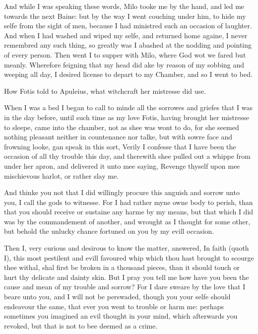 And while I was speaking these words, Milo tooke me by the hand, and led me
towards the next Baine: but by the way I went couching under him, to hide my
selfe from the sight of men, because I had ministred such an occasion of
laughter. And when I had washed and wiped my selfe, and returned home againe, I
never remembred any such thing, so greatly was I abashed at the nodding and
pointing of every person. Then went I to supper with Milo, where God wot we
fared but meanly. Wherefore feigning that my head did ake by reason of my
sobbing and weeping all day, I desired license to depart to my Chamber, and so
I went to bed.


How Fotis told to Apuleius, what witchcraft her mistresse did use.

When I was a bed I began to call to minde all the sorrowes and griefes that I
was in the day before, until such time as my love Fotis, having brought her
mistresse to sleepe, came into the chamber, not as shee was wont to do, for she
seemed nothing pleasant neither in countenance nor talke, but with sowre face
and frowning looke, gan speak in this sort, Verily I confesse that I have been
the occasion of all thy trouble this day, and therewith shee pulled out a
whippe from under her apron, and delivered it unto mee saying, Revenge thyself
upon mee mischievous harlot, or rather slay me.

And thinke you not that I did willingly procure this anguish and sorrow unto
you, I call the gods to witnesse. For I had rather myne owne body to perish,
than that you should receive or sustaine any harme by my means, but that which
I did was by the commandement of another, and wrought as I thought for some
other, but behold the unlucky chance fortuned on you by my evill occasion.

Then I, very curious and desirous to know the matter, answered, In faith (quoth
I), this most pestilent and evill favoured whip which thou hast brought to
scourge thee withal, shal first be broken in a thousand pieces, than it should
touch or hurt thy delicate and dainty skin. But I pray you tell me how have you
been the cause and mean of my trouble and sorrow? For I dare sweare by the love
that I beare unto you, and I will not be perswaded, though you your selfe
should endeavour the same, that ever you went to trouble or harm me: perhaps
sometimes you imagined an evil thought in your mind, which afterwards you
revoked, but that is not to bee deemed as a crime.

